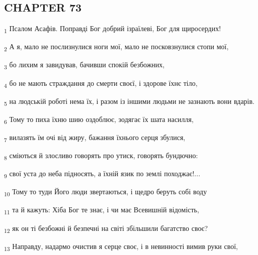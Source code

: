 \subsection{CHAPTER 73}
\begin{tcolorbox}
\textsubscript{1} Псалом Асафів. Поправді Бог добрий ізраїлеві, Бог для щиросердих!
\end{tcolorbox}
\begin{tcolorbox}
\textsubscript{2} А я, мало не послизнулися ноги мої, мало не посковзнулися стопи мої,
\end{tcolorbox}
\begin{tcolorbox}
\textsubscript{3} бо лихим я завидував, бачивши спокій безбожних,
\end{tcolorbox}
\begin{tcolorbox}
\textsubscript{4} бо не мають страждання до смерти своєї, і здорове їхнє тіло,
\end{tcolorbox}
\begin{tcolorbox}
\textsubscript{5} на людській роботі нема їх, і разом із іншими людьми не зазнають вони вдарів.
\end{tcolorbox}
\begin{tcolorbox}
\textsubscript{6} Тому то пиха їхню шию оздоблює, зодягає їх шата насилля,
\end{tcolorbox}
\begin{tcolorbox}
\textsubscript{7} вилазять їм очі від жиру, бажання їхнього серця збулися,
\end{tcolorbox}
\begin{tcolorbox}
\textsubscript{8} сміються й злосливо говорять про утиск, говорять бундючно:
\end{tcolorbox}
\begin{tcolorbox}
\textsubscript{9} свої уста до неба підносять, а їхній язик по землі походжає!...
\end{tcolorbox}
\begin{tcolorbox}
\textsubscript{10} Тому то туди Його люди звертаються, і щедро беруть собі воду
\end{tcolorbox}
\begin{tcolorbox}
\textsubscript{11} та й кажуть: Хіба Бог те знає, і чи має Всевишній відомість,
\end{tcolorbox}
\begin{tcolorbox}
\textsubscript{12} як он ті безбожні й безпечні на світі збільшили багатство своє?
\end{tcolorbox}
\begin{tcolorbox}
\textsubscript{13} Направду, надармо очистив я серце своє, і в невинності вимив руки свої,
\end{tcolorbox}
